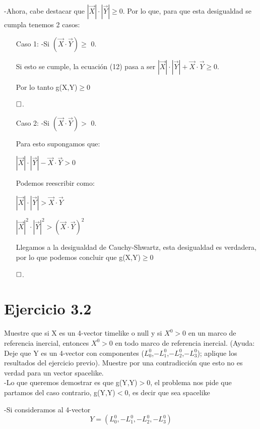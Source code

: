 \documentclass[a4paper, 11pt]{article}
\begin{document}
-Ahora, cabe destacar que $|\vec{X}| \cdot |\vec{Y}|\geq$0. Por lo que, para que esta desigualdad se cumpla tenemos 2 casos:  
\begin{enumerate}
    \item[Caso 1:]
    -Si $(\vec{X}\cdot\vec{Y})\geq$  0.
        \item[]
        Si esto se cumple, la ecuación (12) pasa a ser $|\vec{X}| \cdot |\vec{Y}| + \vec{X}\cdot\vec{Y}\geq$0.
        
        Por lo tanto g(X,Y)$\geq$0
        
        $\hfill\square$.
    \item[Caso 2:]
    -Si $(\vec{X}\cdot\vec{Y})>$ 0.
        \item[]
            Para esto supongamos que:
            \begin{center}
            $|\vec{X}| \cdot |\vec{Y}| - \vec{X}\cdot\vec{Y} >$0
            \end{center}
            Podemos reescribir como:
            \begin{center}
            $|\vec{X}| \cdot |\vec{Y}| > \vec{X}\cdot\vec{Y}$
            
            $|\vec{X}|^2 \cdot |\vec{Y}|^2 > (\vec{X}\cdot\vec{Y})^2$
            \end{center}
        Llegamos a la desigualdad de Cauchy-Shwartz, esta desigualdad es verdadera, por lo que podemos concluir que g(X,Y)$\geq$0
        
        $\hfill\square$.
\end{enumerate}

\newpage
\section*{Ejercicio 3.2}
Muestre que si X es un 4-vector timelike o null y si $X^{0}>$0 en un marco de referencia inercial, entonces $X^{0}>$0 en todo marco de referencia inercial. (Ayuda: Deje que Y es un 4-vector con componentes ($L_{0}^{0}$,$-L_{1}^{0}$,$-L_{2}^{0}$,$-L_{3}^{0}$); aplique los resultados del ejercicio previo). Muestre por una contradicción que esto no es verdad para un vector spacelike.\\

-Lo que queremos demostrar es que g(Y,Y)$>$0, el problema nos pide que partamos del caso contrario, g(Y,Y)$<$0, es decir que sea spacelike 

-Si consideramos al 4-vector
\begin{equation}
    Y=(L_{0}^{0},-L_{1}^{0},-L_{2}^{0},-L_{3}^{0})
\end{equation}
\end{document}
